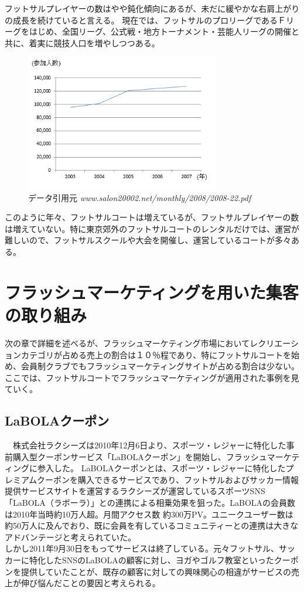 フットサルプレイヤーの数はやや鈍化傾向にあるが、未だに緩やかな右肩上がりの成長を続けていると言える。
現在では、フットサルのプロリーグであるＦリーグをはじめ、全国リーグ、公式戦・地方トーナメント・芸能人リーグの開催と共に、着実に競技人口を増やしつつある。

\begin{figure}[htbp]
	\centering
	\includegraphics[width=85mm, bb=0 0 330 272]{figures/pati.jpg}
	\caption{データ引用元 {\itshape www.salon20002.net/monthly/2008/2008-22.pdf}}
	\label{www.salon20002.net/monthly/2008/2008-22.pdf}
\end{figure}

このように年々、フットサルコートは増えているが、フットサルプレイヤーの数は増えていない。特に東京郊外のフットサルコートのレンタルだけでは、運営が難しいので、フットサルスクールや大会を開催し、運営しているコートが多々ある。

\section{フラッシュマーケティングを用いた集客の取り組み}
次の章で詳細を述べるが、フラッシュマーケティング市場においてレクリエーションカテゴリが占める売上の割合は１０％程であり、特にフットサルコートを始め、会員制クラブでもフラッシュマーケティングサイトが占める割合は少ない。ここでは、フットサルコートでフラッシュマーケティングが適用された事例を見ていく。

\subsection{LaBOLAクーポン}
　株式会社ラクシーズは2010年12月6日より、スポーツ・レジャーに特化した事前購入型クーポンサービス「LaBOLAクーポン」を開始し、フラッシュマーケティングに参入した。
LaBOLAクーポンとは、スポーツ・レジャーに特化したプレミアムクーポンを購入できるサービスであり、フットサルおよびサッカー情報提供サービスサイトを運営するラクシーズが運営しているスポーツSNS「LaBOLA（ラボーラ）」との連携による相乗効果を狙った。LaBOLAの会員数は2010年当時約10万人超。月間アクセス数 約300万PV。ユニークユーザー数は約50万人に及んでおり、既に会員を有しているコミュニティーとの連携は大きなアドバンテージと考えられていた。
\\ しかし2011年9月30日をもってサービスは終了している。元々フットサル、サッカーに特化したSNSのLaBOLAの顧客に対し、ヨガやゴルフ教室といったクーポンを提供していたことが、既存の顧客に対しての興味関心の相違がサービスの売上が伸び悩んだことの要因と考えられる。
\newpage


